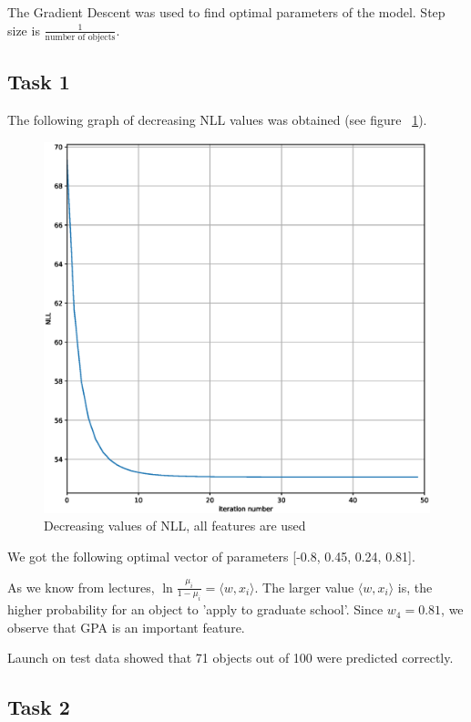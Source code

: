 \documentclass{article}
\begin{document}
The Gradient Descent was used to find optimal parameters of the model. Step size is $\frac{1}{\text{number of objects}}$. 

\subsection{Task 1}

The following graph of decreasing NLL values was obtained (see figure ~\ref{decreasing}).

\begin{figure}
\centering
	\includegraphics[width=\linewidth]{NLL_decreasing}
	\caption{Decreasing values of NLL, all features are used }\label{decreasing}
\end{figure}

We got the following optimal vector of parameters [-0.8,  0.45,  0.24,  0.81].

As we know from lectures, $\ln \frac{\mu_i}{1-\mu_i} = \langle w, x_i \rangle$. The larger value $\langle w, x_i \rangle$ is, the higher probability for an object to 'apply to graduate school'. Since $w_4 = 0.81$, we observe that GPA is an important feature. 

Launch on test data showed that 71 objects out of 100 were predicted correctly.

\subsection{Task 2}
\end{document}
